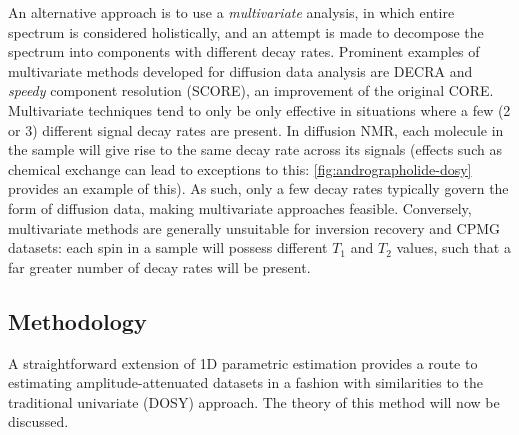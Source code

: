 An alternative approach
is to use a \emph{multivariate} analysis, in which entire spectrum is
considered holistically, and an attempt is made to decompose the spectrum into
components with different decay rates. Prominent examples of multivariate methods
developed for diffusion data analysis are \ac{DECRA}\cite{Windig1998} and
\emph{speedy} component resolution (\acs{SCORE})\cite{Nilsson2008}, an
improvement of the original \acs{CORE}\cite{Stilbs1996,Stilbs1996b}.
Multivariate techniques tend to only be only effective in situations where a
few (2 or 3) different signal decay rates are present. In diffusion
\ac{NMR}, each molecule in the sample will give rise to the same decay rate
across its signals (effects such as chemical exchange can lead to exceptions to
this: \cref{fig:andrographolide-dosy} provides an example of this). As such,
only a few decay rates typically govern the form of diffusion data, making
multivariate approaches feasible.
Conversely, multivariate methods are generally unsuitable for inversion
recovery and \ac{CPMG} datasets: each spin in a sample will possess different
$T_1$ and $T_2$ values, such that a far greater number of decay rates will be
present.

\subsection{Methodology}
\label{subsec:seq-method}
A straightforward extension of \ac{1D} parametric estimation
provides a route to estimating amplitude-attenuated datasets in a
fashion with similarities to the traditional univariate (\ac{DOSY}) approach.
The theory of this method will now be discussed.


